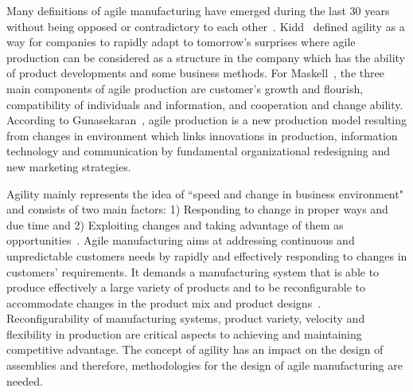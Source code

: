 \documentclass[final,3p,12pt]{elsarticle}
\begin{document}
Many definitions of agile manufacturing have emerged during the last 30 years without being opposed or contradictory to each other~\cite{Dahmardeh.2010}. Kidd~\cite{KIDD.2000} defined agility as a way for companies to rapidly adapt to tomorrow's surprises where agile production can be considered as a structure in the company which has the ability of product developments and some business methods. For Maskell~\cite{Maskell.2001}, the three main components of agile production are customer's growth and flourish, compatibility of individuals and information, and cooperation and change ability. According to Gunasekaran~\cite{GUNASEKARAN.1999}, agile production is a new production model resulting from changes in environment which links innovations in production, information technology and communication by fundamental organizational redesigning and new marketing strategies.

Agility mainly represents the idea of ``speed and change in business environment" and consists of two main factors: 1) Responding to change in proper ways and due time and 2) Exploiting changes and taking advantage of them as opportunities~\cite{SHARIFI.1999}. Agile manufacturing aims at addressing continuous and unpredictable customers needs by rapidly and effectively responding to changes in customers' requirements. It demands a manufacturing system that is able to produce effectively a large variety of products and to be reconfigurable to accommodate changes in the product mix and product designs~\cite{GUNASEKARAN.1999}. Reconfigurability of manufacturing systems, product variety, velocity and flexibility in production are critical aspects to achieving and maintaining competitive advantage. The concept of agility has an impact on the design of assemblies and therefore, methodologies for the design of agile manufacturing are needed.
\end{document}
